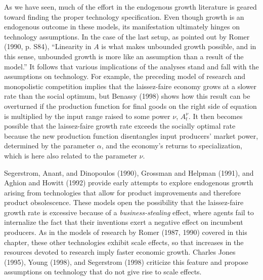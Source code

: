 As we have seen,
much of the effort in the endogenous growth literature is geared toward finding
the proper technology specification. Even though growth is an endogenous outcome
in these models, its manifestation  ultimately hinges on technology assumptions.
In the case of the last setup, as pointed out by Romer (1990, p. S84),
%
``Linearity in $A$ is what makes unbounded growth possible, and in this sense,
unbounded growth is more like an assumption than a result of the model.''
It follows that various implications of the analyses stand and fall with the
assumptions on technology. For example, the preceding
model of research and monopolistic
competition implies that the laissez-faire economy grows at a slower rate
than the social optimum, but Benassy (1998)
%
 shows how this result can be overturned
if the production function for final goods on the right side
of equation
 is multiplied by the input range raised to some power $\nu$,
$A_t^\nu$. It then becomes possible that the laissez-faire growth rate exceeds
the socially optimal rate because the new production function disentangles input
producers' market power, determined by the parameter $\alpha$, and the economy's
returns to specialization, which is here also related to the parameter $\nu$.

  
  
Segerstrom, Anant, and Dinopoulos (1990), Grossman and Helpman (1991), and
Aghion and Howitt (1992)
provide early attempts to explore endogenous growth arising from technologies
that allow for product improvements and therefore product obsolescence.
These models open the possibility that the laissez-faire growth rate is
excessive because of a {\it business-stealing\/} effect, where agents fail to
internalize the fact that their inventions exert a negative effect on incumbent
producers. As in the models of research by Romer (1987, 1990)
%
 covered in this chapter, these other technologies exhibit scale effects, so
that increases in the resources devoted to research imply faster economic growth.
Charles  Jones (1995), Young (1998), and Segerstrom (1998) criticize this feature
and propose assumptions on technology that do not give rise to scale effects.
  

\showchaptIDfalse
\showsectIDfalse
